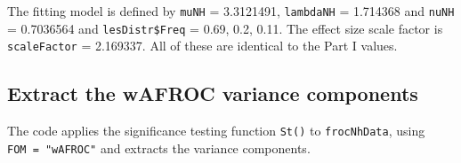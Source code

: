 \documentclass[
]{book}
\newenvironment{Shaded}{\begin{snugshade}}{\end{snugshade}}
\newcommand{\AttributeTok}[1]{\textcolor[rgb]{0.77,0.63,0.00}{#1}}
\newcommand{\CommentTok}[1]{\textcolor[rgb]{0.56,0.35,0.01}{\textit{#1}}}
\newcommand{\DecValTok}[1]{\textcolor[rgb]{0.00,0.00,0.81}{#1}}
\newcommand{\FunctionTok}[1]{\textcolor[rgb]{0.00,0.00,0.00}{#1}}
\newcommand{\NormalTok}[1]{#1}
\newcommand{\OtherTok}[1]{\textcolor[rgb]{0.56,0.35,0.01}{#1}}
\newcommand{\SpecialCharTok}[1]{\textcolor[rgb]{0.00,0.00,0.00}{#1}}
\newcommand{\StringTok}[1]{\textcolor[rgb]{0.31,0.60,0.02}{#1}}
\begin{document}
\begin{Shaded}
\end{Shaded}

The fitting model is defined by \texttt{muNH} = 3.3121491, \texttt{lambdaNH} = 1.714368 and \texttt{nuNH} = 0.7036564 and \texttt{lesDistr\$Freq} = 0.69, 0.2, 0.11. The effect size scale factor is \texttt{scaleFactor} = 2.169337. All of these are identical to the Part I values.

\hypertarget{froc-sample-size-variance-components}{%
\subsection{Extract the wAFROC variance components}\label{froc-sample-size-variance-components}}

The code applies the significance testing function \texttt{St()} to \texttt{frocNhData}, using \texttt{FOM\ =\ "wAFROC"} and extracts the variance components.

\begin{Shaded}
\end{Shaded}
\end{document}
